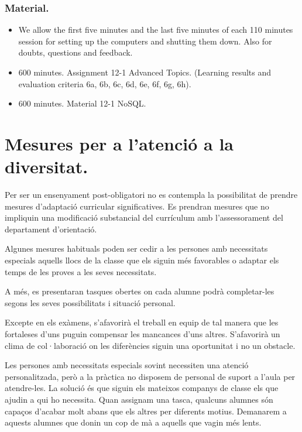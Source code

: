 \documentclass[catalan, a4paper, 12pt, titlepage]{article}
\begin{document}
  \subsubsection{Material.}
  \begin{itemize}
          \item We allow the first five minutes and the last five minutes of each 110 minutes session for setting up the computers and shutting them down. Also for doubts, questions and feedback.
	  \item 600 minutes. Assignment 12-1 Advanced Topics. (\faGraduationCap Learning results and evaluation criteria 6a, 6b, 6c, 6d, 6e, 6f, 6g, 6h).
	  \item 600 minutes. Material 12-1 NoSQL.
  \end{itemize}


\section{Mesures per a l'atenció a la diversitat.}
\label{sec:diversitat}

Per ser un ensenyament post-obligatori no es contempla la possibilitat de prendre mesures d'adaptació curricular significatives. Es prendran mesures que no impliquin una modificació substancial del currículum amb l'assessorament del departament d'orientació.

Algunes mesures habituals poden ser cedir a les persones amb necessitats especials aquells llocs de la classe que els siguin més favorables o adaptar els temps de les proves a les seves necessitats.

A més, es presentaran tasques obertes on cada alumne podrà completar-les segons les seves possibilitats i situació personal.

Excepte en els exàmens, s'afavorirà el treball en equip de tal manera que les fortaleses d'uns puguin compensar les mancances d'uns altres. S'afavorirà un clima de col·laboració on les diferències siguin una oportunitat i no un obstacle.

Les persones amb necessitats especials sovint necessiten una atenció personalitzada, però a la pràctica no disposem de personal de suport a l'aula per atendre-les.
La solució és que siguin els mateixos companys de classe els que ajudin a qui ho necessita.
Quan assignam una tasca, qualcuns alumnes són capaços d'acabar molt abans que els altres per diferents motius.
Demanarem a aquests alumnes que donin un cop de mà a aquells que vagin més lents.
\end{document}
